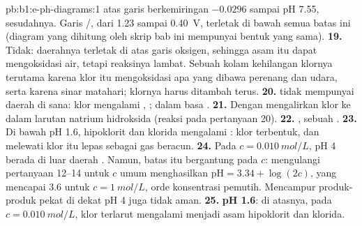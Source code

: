 \begin{solution}{pb:b1:e-ph-diagrams:1}
atas garis berkemiringan $-0.0296$ sampai pH 7.55,  sesudahnya.
Garis /, dari 1.23 sampai 0.40~V, terletak di bawah semua
batas ini (diagram yang dihitung oleh skrip bab ini mempunyai bentuk
yang sama).
\textbf{19.} Tidak: daerahnya terletak di atas garis oksigen, sehingga
asam itu dapat mengoksidasi air, tetapi reaksinya lambat. Sebuah kolam
kehilangan klornya terutama karena klor itu mengoksidasi apa yang
dibawa perenang dan udara, serta karena sinar matahari; klornya harus
ditambah terus.
\textbf{20.}  tidak mempunyai daerah di sana: klor mengalami
, ; dalam basa
.
\textbf{21.} Dengan mengalirkan klor ke dalam larutan natrium hidroksida
(reaksi pada pertanyaan 20).
\textbf{22.} , sebuah .
\textbf{23.} Di bawah pH 1.6, hipoklorit dan klorida mengalami
: klor terbentuk, dan melewati  klor itu
lepas sebagai gas beracun.
\textbf{24.} Pada $c = \qty{0.010}{mol/L}$, pH 4 berada di luar daerah
. Namun, batas itu bergantung pada $c$: mengulangi pertanyaan
12--14 untuk $c$ umum menghasilkan $\mathrm{pH} = 3.34 + \log(2c)$, yang
mencapai 3.6 untuk $c = \qty{1}{mol/L}$, orde konsentrasi pemutih.
Mencampur produk-produk pekat di dekat pH 4 juga tidak aman.
\textbf{25.} \textbf{pH 1.6}: di atasnya, pada $c = \qty{0.010}{mol/L}$,
klor terlarut mengalami  menjadi asam hipoklorit dan
klorida.
\end{solution}
